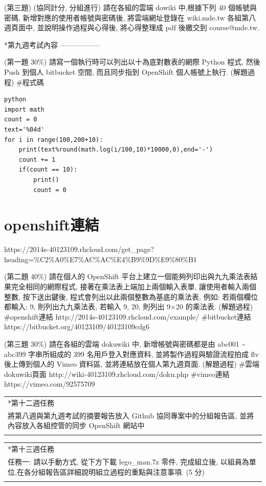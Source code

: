 \documentclass[]{article}
\begin{document}
(第三題) (協同計分, 分組進行) 請在各組的雲端 dowiki 中,根據下列 40
個帳號與密碼, 新增對應的使用者帳號與密碼後, 將雲端網址登錄在 wiki.mde.tw
各組第八週頁面中, 並說明操作過程與心得後, 將心得整理成 pdf 後繳交到
course@mde.tw.

*第九週考試內容 -----------------

(第一題 30\%) 請寫一個執行時可以列出以十為底對數表的網際 Python 程式,
然後 Push 到個人 bitbucket 空間, 而且同步指到 OpenShift 個人帳號上執行.
(解題過程) \#程式碼

\begin{verbatim}
python 
import math
count = 0
text='%04d'
for i in range(100,200+10):
    print(text%round(math.log(i/100,10)*10000,0),end='-')
    count += 1
    if(count == 10):
        print()
        count = 0
\end{verbatim}

\section{openshift連結}\label{openshiftux9023ux7d50}

https://2014s-40123109.rhcloud.com/get\_page?heading=\%C2\%A0\%E7\%AC\%AC\%E4\%B9\%9D\%E9\%80\%B1

(第二題 40\%) 請在個人的 OpenShift
平台上建立一個能夠列印出與九九乘法表結果完全相同的網際程式,
接著在乘法表上端加上兩個輸入表單, 讓使用者輸入兩個整數, 按下送出鍵後,
程式會列出以此兩個整數為基底的乘法表, 例如: 若兩個欄位都輸入: 9,
則列出九九乘法表, 若輸入 9, 20, 則列出 9×20 的乘法表. (解題過程)
\#openshift連結 http://2014s-40123109.rhcloud.com/example/
\#bitbucket連結 https://bitbucket.org/40123109/40123109cdg6

(第三題 30\%) 請在各組的雲端 dokuwiki 中, 新增帳號與密碼都是由 abc001
\textasciitilde{} abc399 字串所組成的 399 名用戶登入對應資料,
並將製作過程與驗證流程拍成 flv 後上傳到個人的 Vimeo 資料區,
並將連結放在個人第九週頁面. (解題過程) \#雲端dokuwiki頁面
http://wiki-40123109.rhcloud.com/doku.php \#vimeo連結
https://vimeo.com/92575709

\begin{longtable}[c]{@{}l@{}}
\toprule\addlinespace
*第十二週任務
\\\addlinespace
\midrule\endhead
將第八週與第九週考試的摘要報告放入 Github 協同專案中的分組報告區,
並將內容放入各組控管的同步 OpenShift 網站中
\\\addlinespace
\bottomrule
\end{longtable}

\begin{longtable}[c]{@{}l@{}}
\toprule\addlinespace
*第十三週任務
\\\addlinespace
\midrule\endhead
任務一: 請以手動方式, 從下方下載 lego\_man.7z 零件, 完成組立後,
以組員為單位,在各分組報告區詳細說明組立過程的重點與注意事項. (5 分)
\\\addlinespace
\bottomrule
\end{longtable}
\end{document}
